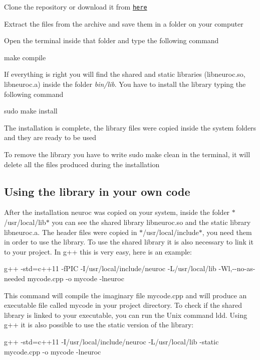 \begin{DoxyEnumerate}
\item Clone the repository or download it from \href{https://github.com/mpatacchiola/neuroc/archive/master.zip}{\tt here}
\item Extract the files from the archive and save them in a folder on your computer
\item Open the terminal inside that folder and type the following command
\item {\ttfamily make compile}
\item If everything is right you will find the shared and static libraries (libneuroc.\-so, libneuroc.\-a) inside the folder {\itshape bin/lib}. You have to install the library typing the following command
\item {\ttfamily sudo make install}
\item The installation is complete, the library files were copied inside the system folders and they are ready to be used
\item To remove the library you have to write {\ttfamily sudo make clean} in the terminal, it will delete all the files produced during the installation
\end{DoxyEnumerate}

\subsection*{Using the library in your own code }

After the installation neuroc was copied on your system, inside the folder $\ast$/usr/local/lib$\ast$ you can see the shared library libneuroc.\-so and the static library libneuroc.\-a. The header files were copied in $\ast$/usr/local/include$\ast$, you need them in order to use the library. To use the shared library it is also necessary to link it to your project. In g++ this is very easy, here is an example\-:

{\ttfamily g++ -\/std=c++11 -\/f\-P\-I\-C -\/\-I/usr/local/include/neuroc -\/\-L/usr/local/lib -\/\-Wl,-\/-\/no-\/as-\/needed mycode.\-cpp -\/o mycode -\/lneuroc}

This command will compile the imaginary file mycode.\-cpp and will produce an executable file called mycode in your project directory. To check if the shared library is linked to your executable, you can run the Unix command ldd. Using g++ it is also possible to use the static version of the library\-:

{\ttfamily g++ -\/std=c++11 -\/\-I/usr/local/include/neuroc -\/\-L/usr/local/lib -\/static mycode.\-cpp -\/o mycode -\/lneuroc}


